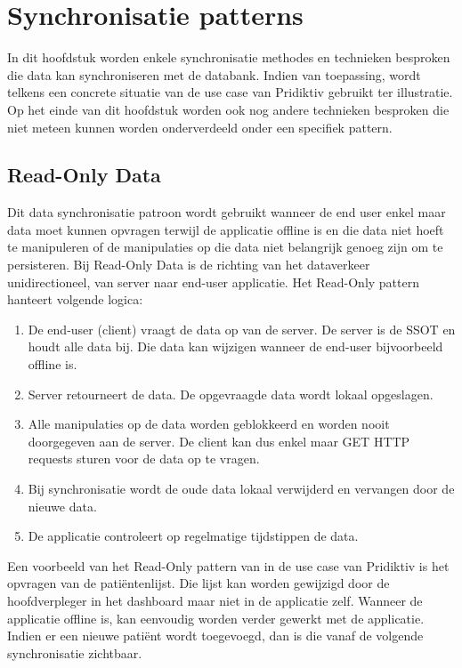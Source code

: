
\chapter{Synchronisatie patterns}
\label{ch:synchronisatiemethdodes}


In dit hoofdstuk worden enkele synchronisatie methodes en technieken besproken die data kan synchroniseren met de databank. Indien van toepassing, wordt telkens een concrete situatie van de use case van Pridiktiv gebruikt ter illustratie. Op het einde van dit hoofdstuk worden ook nog andere technieken besproken die niet meteen kunnen worden onderverdeeld onder een specifiek pattern.

\section{Read-Only Data}
Dit data synchronisatie patroon wordt gebruikt wanneer de end user enkel maar data moet kunnen opvragen terwijl de applicatie offline is en die data niet hoeft te manipuleren of de manipulaties op die data niet belangrijk genoeg zijn om te persisteren. Bij Read-Only Data is de richting van het dataverkeer unidirectioneel, van server naar end-user applicatie. Het Read-Only pattern hanteert volgende logica:
\begin{enumerate}
\item De end-user (client) vraagt de data op van de server. De server is de SSOT en houdt alle data bij. Die data kan wijzigen wanneer de end-user bijvoorbeeld offline is.
\item Server retourneert de data. De opgevraagde data wordt lokaal opgeslagen.
\item Alle manipulaties op de data worden geblokkeerd en worden nooit doorgegeven aan de server. De client kan dus enkel maar GET HTTP requests sturen voor de data op te vragen.
\item Bij synchronisatie wordt de oude data lokaal verwijderd en vervangen door de nieuwe data.
\item De applicatie controleert op regelmatige tijdstippen de data.
\end{enumerate}
Een voorbeeld van het Read-Only pattern van in de use case van Pridiktiv is het opvragen van de pati\"entenlijst. Die lijst kan worden gewijzigd door de hoofdverpleger in het dashboard maar niet in de applicatie zelf. Wanneer de applicatie offline is, kan eenvoudig worden verder gewerkt met de applicatie. Indien er een nieuwe pati\"ent wordt toegevoegd, dan is die vanaf de volgende synchronisatie zichtbaar.
